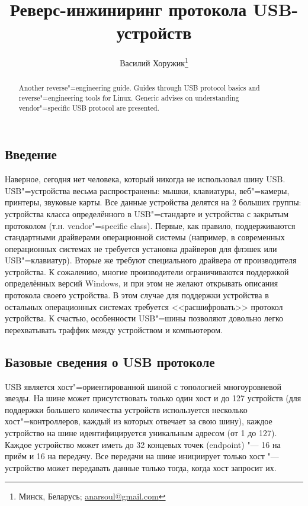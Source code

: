 \documentclass[10pt, a5paper]{article}
\begin{document}
\title{Реверс-инжиниринг протокола USB-устройств}%

\author{Василий Хоружик\footnote{Минск, Беларусь; \url{anarsoul@gmail.com}}}
\maketitle

\begin{abstract}
Another reverse"=engineering guide. Guides through USB protocol basics and reverse"=engineering tools for Linux. Generic advises on understanding vendor"=specific USB protocol are presented. 
\end{abstract}

\subsection*{Введение}

Наверное, сегодня нет человека, который никогда не использовал шину USB. USB"=устройства весьма распространены: мышки, клавиатуры, веб"=камеры, принтеры, звуковые карты. Все данные устройства делятся на 2 больших группы: устройства класса определённого в USB"=стандарте и устройства с закрытым протоколом (т.н. vendor"=specific class). Первые, как правило, поддерживаются стандартными драйверами операционной системы (например, в современных операционных системах не требуется установка драйверов для флэшек или USB"=клавиатур). Вторые же требуют специального драйвера от производителя устройства. К сожалению, многие производители ограничиваются поддержкой определённых версий Windows, и при этом не желают открывать описания протокола своего устройства. В этом случае для поддержки устройства в остальных операционных системах требуется <<расшифровать>> протокол устройства. К счастью, особенности USB"=шины позволяют довольно легко перехватывать траффик между устройством и компьютером.

\subsection*{Базовые сведения о USB протоколе}

USB является хост"=ориентированной шиной с топологией многоуровневой звезды. На шине может присутствовать только один хост и до 127 устройств (для поддержки большего количества устройств используется несколько хост"=контроллеров, каждый из которых отвечает за свою шину), каждое устройство на шине идентифицируется уникальным адресом (от 1 до 127). Каждое устройство может иметь до 32 концевых точек (endpoint) "--- 16 на приём и 16 на передачу. Все передачи на шине инициирует только хост "--- устройство может передавать данные только тогда, когда хост запросит их.
\end{document}
